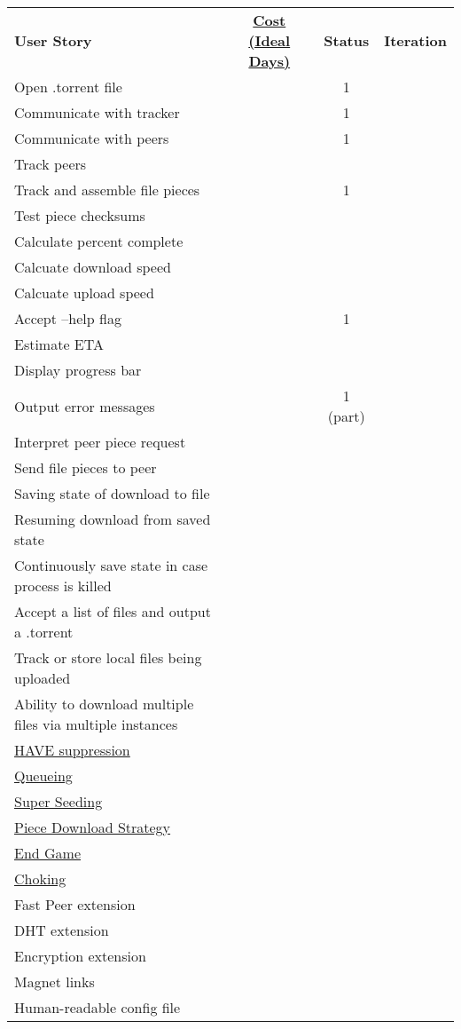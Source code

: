 \documentclass[letter]{scrartcl}
\begin{document}
\begin{tabularx}{\textwidth}{X c c c}
\textbf{User Story} & \href{http://c2.com/cgi/wiki?IdealProgrammingTime}{\textbf{Cost (Ideal Days)}}
& \textbf{Status} & \textbf{Iteration} \\
Open .torrent file & & 1 \\
Communicate with tracker & & 1 \\
Communicate with peers & & 1 \\
Track peers \\
Track and assemble file pieces & & 1 \\
Test piece checksums \\
Calculate percent complete \\
Calcuate download speed \\
Calcuate upload speed \\
Accept --help flag & & 1 \\
Estimate ETA \\
Display progress bar \\
Output error messages & & 1 (part) \\
Interpret peer piece request \\
Send file pieces to peer \\
Saving state of download to file \\
Resuming download from saved state \\
Continuously save state in case process is killed \\
Accept a list of files and output a .torrent \\
Track or store local files being uploaded \\
Ability to download multiple files via multiple instances \\
\href{https://wiki.theory.org/BitTorrentSpecification\#have:_.3Clen.3D0005.3E.3Cid.3D4.3E.3Cpiece_index.3E}{HAVE suppression} \\
\href{https://wiki.theory.org/BitTorrentSpecification\#Queuing}{Queueing} \\
\href{https://wiki.theory.org/BitTorrentSpecification\#Super_Seeding}{Super Seeding} \\
\href{https://wiki.theory.org/BitTorrentSpecification\#Piece_downloading_strategy}{Piece Download Strategy} \\
\href{https://wiki.theory.org/BitTorrentSpecification\#End_Game}{End Game} \\
\href{https://wiki.theory.org/BitTorrentSpecification\#Choking_and_Optimistic_Unchoking}{Choking} \\
Fast Peer extension \\
DHT extension \\
Encryption extension \\
Magnet links \\
Human-readable config file
\end{tabularx}
\end{document}
